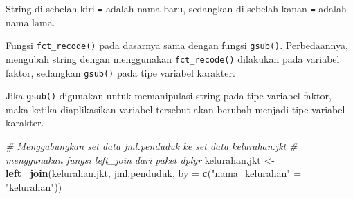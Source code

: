 \documentclass[openany]{book}
\newenvironment{Shaded}{\begin{snugshade}}{\end{snugshade}}
\newcommand{\KeywordTok}[1]{\textcolor[rgb]{0.13,0.29,0.53}{\textbf{#1}}}
\newcommand{\DataTypeTok}[1]{\textcolor[rgb]{0.13,0.29,0.53}{#1}}
\newcommand{\StringTok}[1]{\textcolor[rgb]{0.31,0.60,0.02}{#1}}
\newcommand{\CommentTok}[1]{\textcolor[rgb]{0.56,0.35,0.01}{\textit{#1}}}
\newcommand{\OperatorTok}[1]{\textcolor[rgb]{0.81,0.36,0.00}{\textbf{#1}}}
\newcommand{\NormalTok}[1]{#1}
\begin{document}
String di sebelah kiri \texttt{=} adalah nama baru, sedangkan di sebelah
kanan \texttt{=} adalah nama lama.

Fungsi \texttt{fct\_recode()} pada dasarnya sama dengan fungsi
\texttt{gsub()}. Perbedaannya, mengubah string dengan menggunakan
\texttt{fct\_recode()} dilakukan pada variabel faktor, sedangkan
\texttt{gsub()} pada tipe variabel karakter.

Jika \texttt{gsub()} digunakan untuk memanipulasi string pada tipe
variabel faktor, maka ketika diaplikasikan variabel tersebut akan
berubah menjadi tipe variabel karakter.

\begin{Shaded}
\begin{Highlighting}[]
\CommentTok{# Menggabungkan set data jml.penduduk ke set data kelurahan.jkt}
\CommentTok{# menggunakan fungsi left_join dari paket dplyr}
\NormalTok{kelurahan.jkt <-}
\StringTok{  }\KeywordTok{left_join}\NormalTok{(kelurahan.jkt, jml.penduduk, }\DataTypeTok{by =} \KeywordTok{c}\NormalTok{(}\StringTok{"nama_kelurahan"}\NormalTok{ =}\StringTok{ "kelurahan"}\NormalTok{))}
\end{Highlighting}
\end{Shaded}

\begin{Shaded}
\end{Shaded}
\end{document}
